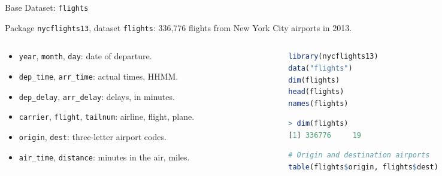 \documentclass[9pt,aspectratio=169]{beamer}
\begin{document}
\begin{frame}[fragile]{Base Dataset: \texttt{flights}}
\linespread{1.3}\selectfont %

Package \texttt{nycflights13}, dataset \texttt{flights}: 336,776 flights from New York City airports in 2013.

\begin{columns}
  \begin{column}{0.55\textwidth}
  \begin{itemize}
    \item \texttt{year}, \texttt{month}, \texttt{day}: date of departure.
    \item \texttt{dep\_time}, \texttt{arr\_time}: actual times, HHMM.
    \item \texttt{dep\_delay}, \texttt{arr\_delay}: delays, in minutes.
    \item \texttt{carrier}, \texttt{flight}, \texttt{tailnum}: airline, flight, plane.
    \item \texttt{origin}, \texttt{dest}: three-letter airport codes.
    \item \texttt{air\_time}, \texttt{distance}: minutes in the air, miles.
  \end{itemize}
  \end{column}
  \begin{column}{0.4\textwidth}
\begin{lstlisting}[language=R, basicstyle=\ttfamily\scriptsize]
library(nycflights13)
data("flights")
dim(flights)
head(flights)
names(flights)
\end{lstlisting}
\begin{lstlisting}[language=R, basicstyle=\ttfamily\scriptsize]
> dim(flights)
[1] 336776     19
\end{lstlisting}
\begin{lstlisting}[language=R, basicstyle=\ttfamily\scriptsize]
# Origin and destination airports
table(flights$origin, flights$dest)
\end{lstlisting}
  \end{column}
\end{columns}
\end{frame}
\end{document}
